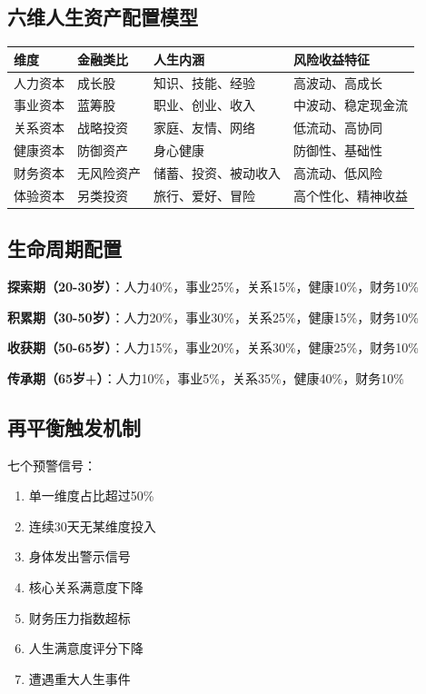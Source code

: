 \documentclass[12pt,a4paper]{article}
\begin{document}
\subsection{六维人生资产配置模型}

\begin{table}[h]
\centering
\begin{tabular}{llll}
\toprule
维度 & 金融类比 & 人生内涵 & 风险收益特征 \\
\midrule
人力资本 & 成长股 & 知识、技能、经验 & 高波动、高成长 \\
事业资本 & 蓝筹股 & 职业、创业、收入 & 中波动、稳定现金流 \\
关系资本 & 战略投资 & 家庭、友情、网络 & 低流动、高协同 \\
健康资本 & 防御资产 & 身心健康 & 防御性、基础性 \\
财务资本 & 无风险资产 & 储蓄、投资、被动收入 & 高流动、低风险 \\
体验资本 & 另类投资 & 旅行、爱好、冒险 & 高个性化、精神收益 \\
\bottomrule
\end{tabular}
\end{table}

\subsection{生命周期配置}

\textbf{探索期（20-30岁）}：人力40\%，事业25\%，关系15\%，健康10\%，财务10\%

\textbf{积累期（30-50岁）}：人力20\%，事业30\%，关系25\%，健康15\%，财务10\%

\textbf{收获期（50-65岁）}：人力15\%，事业20\%，关系30\%，健康25\%，财务10\%

\textbf{传承期（65岁+）}：人力10\%，事业5\%，关系35\%，健康40\%，财务10\%

\subsection{再平衡触发机制}

七个预警信号：
\begin{enumerate}
    \item 单一维度占比超过50\%
    \item 连续30天无某维度投入
    \item 身体发出警示信号
    \item 核心关系满意度下降
    \item 财务压力指数超标
    \item 人生满意度评分下降
    \item 遭遇重大人生事件
\end{enumerate}
\end{document}
